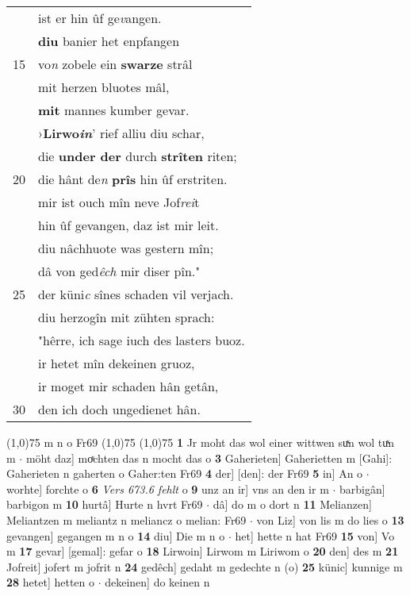 \documentclass[8pt,a4paper,notitlepage]{article}
\begin{document}
\begin{table}[ht]
\begin{minipage}[t]{0.5\linewidth}
\begin{tabular}{rl}
 & ist er hin ûf ge\textit{v}angen.\\ 
 & \textbf{diu} banier het enpfangen\\ 
15 & vo\textit{n} zobele ein \textbf{swarze} strâl\\ 
 & mit herzen bluotes mâl,\\ 
 & \textbf{mit} mannes kumber gevar.\\ 
 & ›\textbf{Lirwo\textit{in}}' rief alliu diu schar,\\ 
 & die \textbf{under der} durch \textbf{strîten} riten;\\ 
20 & die hânt de\textit{n} \textbf{prîs} hin ûf erstriten.\\ 
 & mir ist ouch mîn neve Jof\textit{rei}t\\ 
 & hin ûf gevangen, daz ist mir leit.\\ 
 & diu nâchhuote was gestern mîn;\\ 
 & dâ von ged\textit{êch} mir diser pîn."\\ 
25 & der küni\textit{c} sînes schaden vil verjach.\\ 
 & diu herzogîn mit zühten sprach:\\ 
 & "hêrre, ich sage iuch des lasters buoz.\\ 
 & ir hetet mîn dekeinen gruoz,\\ 
 & ir moget mir schaden hân getân,\\ 
30 & den ich doch ungedienet hân.\\ 
\end{tabular}
\scriptsize
\line(1,0){75} \newline
m n o Fr69 \newline
\line(1,0){75} \newline
\newline
\line(1,0){75} \newline
\textbf{1} Jr moht das wol einer wittwen suͯn wol tuͯn m  $\cdot$ möht daz] moͯchten das n mocht das o \textbf{3} Gaherieten] Gaherietten m [Gahi]: Gaherieten n gaherten o Gaher:ten Fr69 \textbf{4} der] [den]: der Fr69 \textbf{5} in] An o  $\cdot$ worhte] forchte o \textbf{6} \textit{Vers 673.6 fehlt} o  \textbf{9} unz an ir] vns an den ir m  $\cdot$ barbigân] barbigon m \textbf{10} hurtâ] Hurte n hvrt Fr69  $\cdot$ dâ] do m o dort n \textbf{11} Melianzen] Meliantzen m meliantz n meliancz o melian: Fr69  $\cdot$ von Liz] von lis m do lies o \textbf{13} gevangen] gegangen m n o \textbf{14} diu] Die m n o  $\cdot$ het] hette n hat Fr69 \textbf{15} von] Vo m \textbf{17} gevar] [gemal]: gefar o \textbf{18} Lirwoin] Lirwom m Liriwom o \textbf{20} den] des m \textbf{21} Jofreit] jofert m jofrit n \textbf{24} gedêch] gedaht m gedechte n (o) \textbf{25} künic] kunnige m \textbf{28} hetet] hetten o  $\cdot$ dekeinen] do keinen n \newline
\end{minipage}
\end{table}
\end{document}
